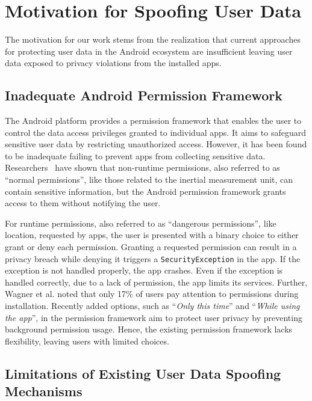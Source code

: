 \section{Motivation for Spoofing User Data}
\label{sec:motivation}

The motivation for our work stems from the realization that current approaches for protecting user data in the Android ecosystem are insufficient leaving user data exposed to privacy violations from the installed apps. 

\subsection{Inadequate Android Permission Framework}

The Android platform provides a permission framework that enables the user to control the data access privileges granted to individual apps. It aims to safeguard sensitive user data by restricting unauthorized access. However, it has been found to be inadequate failing to prevent apps from collecting sensitive data. Researchers~\cite{hasan2013sensing, simon2013pin, ba2020learning, shen2015input, lin2019motion} have shown that non-runtime permissions, also referred to as ``normal permissions'', like those related to the inertial measurement unit, can contain sensitive information, but the Android permission framework grants access to them without notifying the user.

For runtime permissions, also referred to as ``dangerous permissions'', like location, requested by apps, the user is presented with a binary choice to either grant or deny each permission. Granting a requested permission can result in a privacy breach while denying it triggers a \texttt{SecurityException} in the app. If the exception is not handled properly, the app crashes. Even if the exception is handled correctly, due to a lack of permission, the app limits its services. Further, Wagner et al.\cite{wijesekera2017feasibility} noted that only 17\% of users pay attention to permissions during installation. Recently added options, such as ``\textit{Only this time}'' and ``\textit{While using the app}'', in the permission framework aim to protect user privacy by preventing background permission usage. Hence, the existing permission framework lacks flexibility, leaving users with limited choices.

\subsection{Limitations of Existing User Data Spoofing Mechanisms}

